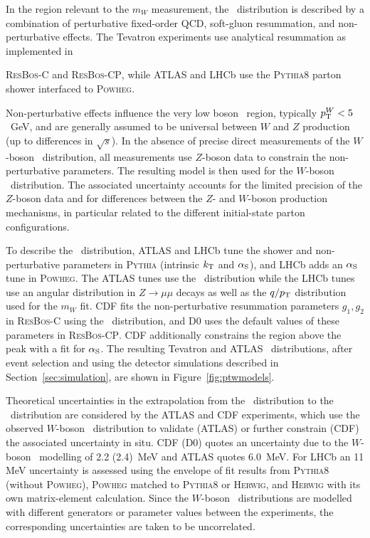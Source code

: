 
In the region relevant to the $m_W$ measurement, the \pTW~distribution is described by a combination of 
perturbative fixed-order QCD, soft-gluon resummation, and non-perturbative effects.  The Tevatron experiments 
use analytical resummation as implemented in {\textsc{ResBos-C} and \textsc{ResBos-CP}, while ATLAS and LHCb
use the \textsc{Pythia8} parton shower interfaced to \textsc{Powheg}.  

Non-perturbative effects influence the very low boson \pTW~region, typically $p_{\scriptsize\textrm{T}}^{W}<5$~GeV, and are generally 
assumed to be universal between $W$ and $Z$ production (up to differences in $\sqrt{s}$).  In the absence of 
precise direct measurements of the $W$-boson \pT~distribution, all measurements use $Z$-boson data to constrain
the non-perturbative parameters.  The resulting model is then used for the $W$-boson \pT~distribution.  The
associated uncertainty accounts for the limited precision of the $Z$-boson data and for differences between
the $Z$- and $W$-boson production mechanisms, in particular related to the different initial-state parton 
configurations.  

To describe the \pTW~distribution, ATLAS and LHCb tune the shower and non-perturbative parameters in \textsc{Pythia} 
(intrinsic $k_{\scriptsize\textrm{T}}$ and $\alpha_{\scriptsize\textrm{S}}$), and LHCb adds an
$\alpha_{\scriptsize\textrm{S}}$ tune in
\textsc{Powheg}.  The ATLAS tunes use the \pTZ~distribution while the LHCb tunes use an angular distribution in
$Z\to\mu\mu$ decays as well as the $q / p_{\scriptsize\textrm{T}}$ distribution used for the $m_W$ fit.  CDF fits the non-perturbative
resummation parameters $g_1,g_2$ in \textsc{ResBos-C}
using the \pTZ~distribution, and D0 uses the default values of these parameters in \textsc{ResBos-CP}.  CDF additionally
constrains the region above the peak with a fit for $\alpha_{\scriptsize\textrm{S}}$.  The resulting Tevatron and ATLAS
\pTW~distributions, after event selection and using the detector simulations described in Section~\ref{sec:simulation},
are shown in Figure~\ref{fig:ptwmodels}.

Theoretical uncertainties in the extrapolation from the \pTZ~distribution to the \pTW~distribution
are considered by the ATLAS and CDF experiments, which use the observed $W$-boson \pT~distribution to validate 
(ATLAS) or further constrain (CDF) the associated uncertainty in situ.  
CDF (D0) quotes an uncertainty due to the $W$-boson \pT~modelling of 2.2 (2.4)~MeV and ATLAS quotes 6.0~MeV.
For LHCb an 11 MeV uncertainty is assessed using the envelope of fit results from \textsc{Pythia8} 
(without \textsc{Powheg}), \textsc{Powheg} matched to \textsc{Pythia8} or \textsc{Herwig}, and \textsc{Herwig}
with its own matrix-element calculation.  Since the $W$-boson \pT~distributions are modelled with different generators
or parameter values between the experiments, the corresponding uncertainties are taken to be uncorrelated.  

}
